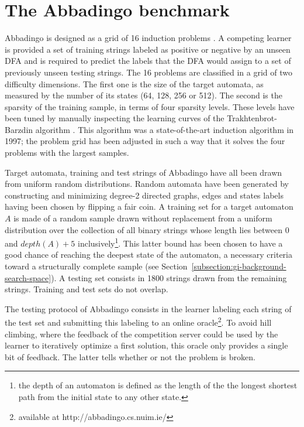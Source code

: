 \section{The Abbadingo benchmark\label{section:stamina-abbadingo}}

Abbadingo is designed as a grid of 16 induction problems \cite{Lang:1998}. A competing learner is provided a set of training strings labeled as positive or negative by an unseen DFA and is required to predict the labels that the DFA would assign to a set of previously unseen testing strings. The 16 problems are classified in a grid of two difficulty dimensions. The first one is the size of the target automata, as measured by the number of its states (64, 128, 256 or 512). The second is the sparsity of the training sample, in terms of four sparsity levels. These levels have been tuned by manually inspecting the learning curves of the Trakhtenbrot-Barzdin algorithm \cite{Trakhtenbrot:1973, Lang:1992}. This algorithm was a state-of-the-art induction algorithm in 1997; the problem grid has been adjusted in such a way that it solves the four problems with the largest samples.

Target automata, training and test strings of Abbadingo have all been drawn from uniform random distributions. Random automata have been generated by constructing and minimizing degree-2 directed graphs, edges and states labels having been chosen by flipping a fair coin. A training set for a target automaton $A$ is made of a random sample drawn without replacement from a uniform distribution over the collection of all binary strings whose length lies between 0 and $depth(A)+5$ inclusively\footnote{the depth of an automaton is defined as the length of the the longest shortest path from the initial state to any other state.}. This latter bound has been chosen to have a good chance of reaching the deepest state of the automaton, a necessary criteria toward a structurally complete sample (see Section~\ref{subsection:gi-background-search-space}). A testing set consists in 1800 strings drawn from the remaining strings. Training and test sets do not overlap.

The testing protocol of Abbadingo consists in the learner labeling each string of the test set and submitting this labeling to an online oracle\footnote{available at http://abbadingo.cs.nuim.ie/}. To avoid hill climbing, where the feedback of the competition server could be used by the learner to iteratively optimize a first solution, this oracle only provides a single bit of feedback. The latter tells whether or not the problem is broken. 

